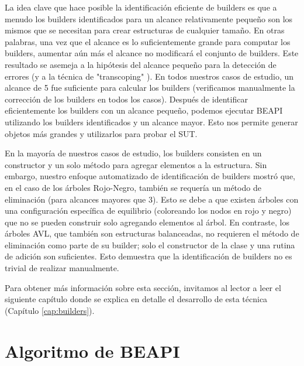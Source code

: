 La idea clave que hace posible la identificación eficiente de builders es que a menudo los builders identificados para un alcance relativamente pequeño son los mismos que se necesitan para crear estructuras de cualquier tamaño. En otras palabras, una vez que el alcance es lo suficientemente grande para computar los builders, aumentar aún más el alcance no modificará el conjunto de builders. Este resultado se asemeja a la hipótesis del alcance pequeño para la detección de errores \cite{Andoni02} (y a la técnica de "transcoping" \cite{Rosner13}). En todos nuestros casos de estudio, un alcance de 5 fue suficiente para calcular los builders (verificamos manualmente la corrección de los builders en todos los casos). Después de identificar eficientemente los builders con un alcance pequeño, podemos ejecutar \textsf{BEAPI} utilizando los builders identificados y un alcance mayor. Esto nos permite generar objetos más grandes y utilizarlos para probar el SUT.

En la mayoría de nuestros casos de estudio, los builders consisten en un constructor y un solo método para agregar elementos a la estructura. Sin embargo, nuestro enfoque automatizado de identificación de builders mostró que, en el caso de los árboles Rojo-Negro, también se requería un método de eliminación (para alcances mayores que 3). Esto se debe a que existen árboles con una configuración específica de equilibrio (coloreando los nodos en rojo y negro) que no se pueden construir solo agregando elementos al árbol. En contraste, los árboles AVL, que también son estructuras balanceadas, no requieren el método de eliminación como parte de su builder; solo el constructor de la clase y una rutina de adición son suficientes. Esto demuestra que la identificación de builders no es trivial de realizar manualmente.

Para obtener más información sobre esta sección, invitamos al lector a leer el siguiente capítulo donde se explica en detalle el desarrollo de esta técnica (Capítulo \ref{cap:builders}).

\section{Algoritmo de BEAPI}
\label{sec:beapiTechnique}

